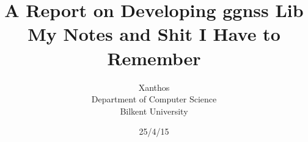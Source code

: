 \documentclass[a4paper, 10pt]{article}
\begin{document}
\title{A Report on Developing ggnss Lib\\ My Notes and Shit I Have to Remember}

\author{Xanthos \\
Department of Computer Science\\
Bilkent University\\
}
\date{25/4/15}

\maketitle
\tableofcontents
\listoffigures
\listoftables


\newpage
\end{document}
